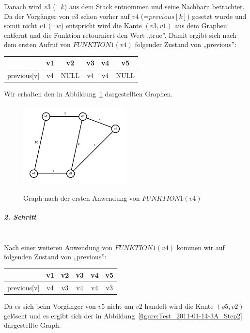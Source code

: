 \documentclass[a4paper, 12pt]{article}
\begin{document}
Danach wird $v3$ (=$k$) aus dem Stack entnommen und seine Nachbarn betrachtet.
Da der Vorgänger von $v3$ schon vorher auf $v4$ (=$previous[k]$) gesetzt wurde
und somit nicht $v1$ (=$w$) entspricht wird die Kante $(v3,v1)$ aus dem
Graphen entfernt und die Funktion retourniert den Wert „true”. Damit ergibt
sich nach dem ersten Aufruf von $FUNKTION1(v4)$ folgender Zustand von
„previous”:

\begin{center}
	\begin{tabular}{lccccc}
					& v1	& v2	& v3 & v4	& v5\\
		\hline
		previous[v] & v4	& NULL	& v4 & v4	& NULL\\
	\end{tabular}
\end{center}

Wir erhalten den in Abbildung~\ref{figure:Test_2011-01-14-3A_Step1}
dargestellten Graphen.

\begin{figure}[htbp]
	\caption{Graph nach der ersten Anwendung von $FUNKTION1(v4)$}
	\vskip 0.2cm
	\centering
	\includegraphics[width=0.5\textwidth]{Figures/Test_2011-01-14-3A_Step1}
	\label{figure:Test_2011-01-14-3A_Step1}
\end{figure}

\subparagraph{2. Schritt}~\\

Nach einer weiteren Anwendung von $FUNKTION1(v4)$ kommen wir auf folgenden
Zustand von „previous”:

\begin{center}
	\begin{tabular}{lccccc}
					& v1	& v2	& v3 & v4	& v5\\
		\hline
		previous[v] & v4	& v3	& v4	& v4 & v3\\
	\end{tabular}
\end{center}

Da es sich beim Vorgänger von $v5$ nicht um $v2$ handelt wird die Kante
$(v5,v2)$ gelöscht und es ergibt sich der in
Abbildung~\ref{figure:Test_2011-01-14-3A_Step2} dargestellte Graph.
\end{document}
